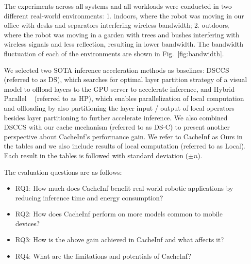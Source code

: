The experiments across all systems and all workloads were conducted in two different real-world environments: 1. indoors, where the robot was moving in our office with desks and separators interfering wireless bandwidth;
2. outdoors, where the robot was moving in a garden with trees and bushes interfering with wireless signals and less reflection, resulting in lower bandwidth. 
The bandwidth fluctuation of each of the environments are shown in Fig.~\ref{fig:bandwidth}.

We selected two SOTA inference acceleration methods as baselines: DSCCS~\cite{liang2023dnn} (referred to as DS), which searches for optimal layer partition strategy of a visual model to offload layers to the GPU server to accelerate inference, and Hybrid-Parallel ~\cite{sun2024hybridparallel} (referred to as HP), which enables parallelization of local computation and offloading by also partitioning the layer input / output of local operators besides layer partitioning to further accelerate inference. 
We also combined DSCCS with our cache mechanism (referred to as DS-C) to present another perspective about CacheInf's performance gain.
We refer to CacheInf as Ours in the tables and we also include results of local computation (referred to as Local).
Each result in the tables is followed with standard deviation ($\pm n$).

The evaluation questions are as follows:
\begin{itemize}
    \item RQ1: How much does CacheInf benefit real-world robotic applications by reducing inference time and energy consumption?
    \item RQ2: How does CacheInf perform on more models common to mobile devices?
    \item RQ3: How is the above gain achieved in CacheInf and what affects it?
    \item RQ4: What are the limitations and potentials of CacheInf?
\end{itemize}

